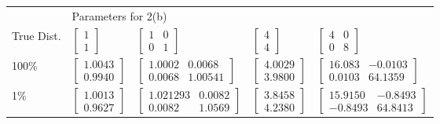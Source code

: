 \documentclass[ 12pt ]{article}
\begin{document}
\begin{enumerate}
\begin{enumerate}
\begin{center}
                \begin{tabular}{|l|llll|}
                    \hline
            & \multicolumn{4}{l|}{Parameters for 2(b)} \\
                    True Dist. & $\begin{bmatrix} 1 \\ 1 \end{bmatrix}$ & $\begin{bmatrix} 1 & 0 \\ 0 & 1 \end{bmatrix}$ & $\begin{bmatrix} 4 \\ 4 \end{bmatrix}$ & $\begin{bmatrix} 4 & 0 \\ 0 & 8 \end{bmatrix}$ \\
                    100\% & $\begin{bmatrix} 1.0043 \\ 0.9940 \end{bmatrix}$ & $\begin{bmatrix} 1.0002 & 0.0068 \\  0.0068 & 1.00541 \end{bmatrix}$ & $\begin{bmatrix} 4.0029 \\ 3.9800 \end{bmatrix}$ & $\begin{bmatrix} 16.083 & -0.0103 \\ 0.0103 & 64.1359 \end{bmatrix}$ \\
                    1\% & $\begin{bmatrix} 1.0013 \\ 0.9627 \end{bmatrix}$ & $\begin{bmatrix} 1.021293 & 0.0082 \\ 0.0082 & 1.0569 \end{bmatrix}$ & $\begin{bmatrix} 3.8458 \\ 4.2380 \end{bmatrix}$ & $\begin{bmatrix} 15.9150 & -0.8493 \\ -0.8493 & 64.8413 \end{bmatrix}$\\

\end{tabular}
\end{center}
\end{enumerate}
\end{enumerate}
\end{document}
